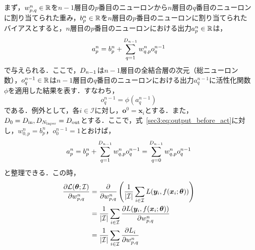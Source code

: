 \documentclass[12pt]{jarticle}
\numberwithin{equation}{section}    %
\numberwithin{figure}{section}      %
\numberwithin{table}{section}      %
\begin{document}
まず，$w_{p, q}^{n} \in \mathbb{R}$を$n - 1$層目の$p$番目のニューロンから$n$層目の$q$番目のニューロンに割り当てられた重み，$b_{p}^{n} \in \mathbb{R}$を$n$層目の$p$番目のニューロンに割り当てられたバイアスとすると，$n$層目の$p$番目のニューロンにおける出力$a_{p}^{n} \in \mathbb{R}$は，
\begin{equation}
    \label{sec3:eq:output_before_act}
    a_{p}^{n} = b_{p}^{n} + \sum_{q = 1}^{D_{n - 1}} w_{q, p}^{n} o_{q}^{n - 1}
\end{equation}
で与えられる．ここで，$D_{n - 1}$は$n - 1$層目の全結合層の次元（総ニューロン数），$o_{q}^{n - 1} \in \mathbb{R}$は$n - 1$層目の$q$番目のニューロンにおける出力$a_{q}^{n - 1}$に活性化関数$\phi$を適用した結果を表す．すなわち，
\begin{equation}
    o_{q}^{n - 1} = \phi(a_{q}^{n - 1})
\end{equation}
である．例外として，各$i \in \mathcal{I}$に対し，$\bm{o}^{0} = \bm{x}_{i}$とする．また，$D_{0} = D_{\text{in}}, D_{N_{\text{layer}}} = D_{\text{out}}$とする．ここで，式~\eqref{sec3:eq:output_before_act}に対し，$w_{0, p}^{n} = b_{p}^{n}$，$o_{0}^{n - 1} = 1$とおけば，
\begin{equation}
    \label{sec3:eq:output_before_act_2}
    a_{p}^{n} = b_{p}^{n} + \sum_{q = 1}^{D_{n - 1}} w_{q, p}^{n} o_{q}^{n - 1}
    = \sum_{q = 0}^{D_{n - 1}} w_{q, p}^{n} o_{q}^{n - 1}
\end{equation}
と整理できる．この時，
\begin{align}
    \frac{\partial \mathcal{L}(\bm{\theta}; \mathcal{I})}{\partial w_{p, q}^{n}} & = \frac{\partial}{\partial w_{p, q}^{n}} \left(\frac{1}{|\mathcal{I}|} \sum_{i \in \mathcal{I}} L(\bm{y}_{i}, f(\bm{x}_{i}; \bm{\theta}))\right) \\
                                                                                                                & = \frac{1}{|\mathcal{I}|} \sum_{i \in \mathcal{I}} \frac{\partial L(\bm{y}_{i}, f(\bm{x}_{i}; \bm{\theta}))}{\partial w_{p, q}^{n}}              \\
                                                                                                                & = \frac{1}{|\mathcal{I}|} \sum_{i \in \mathcal{I}} \frac{\partial L_{i}}{\partial w_{p, q}^{n}}
\end{align}
\end{document}
